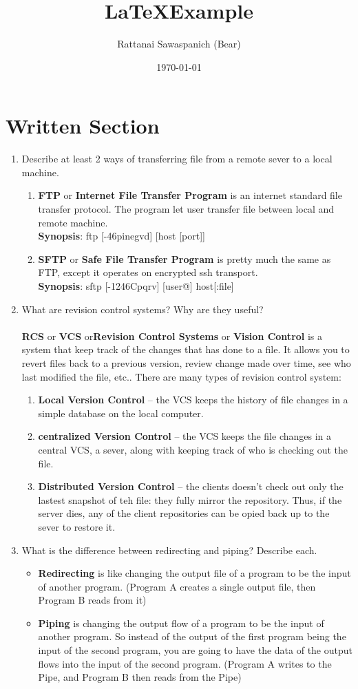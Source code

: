 \documentclass[a4paper,12pt]{article}
\title{\LaTeX Example}
\author{Rattanai Sawaspanich (Bear)}
\date{\today}
\begin{document}
\section{Written Section}
\begin{enumerate}
	\item Describe at least 2 ways of transferring file from a remote sever to a local machine.
		\begin{enumerate}
			\item \textbf{FTP} or \textbf{Internet File Transfer Program} is an internet standard file transfer protocol. The program let user transfer file between local and remote machine.
				\\ 
				\textbf{Synopsis}: ftp [-46pinegvd] [host [port]]
			\item \textbf{SFTP} or \textbf{Safe File Transfer Program} is pretty much the same as FTP, except it operates on encrypted ssh transport. 
				\\			
				\textbf{Synopsis}: sftp [-1246Cpqrv] [user@] host[:file]
		\end{enumerate}
	\item What are revision control systems? Why are they useful?\\ 
		\\
		 \textbf{RCS} or \textbf{VCS} or\textbf{Revision Control Systems} or \textbf{Vision Control} is a system that keep track of the changes that has done to a file. 
		It allows you to revert files back to a previous version, review change made over time, see who last modified the file, etc..
		There are many types of revision control system:
		\begin{enumerate}
			\item \textbf{Local Version Control} -- the VCS keeps the history of file changes in a simple database on the local computer.
			\item \textbf{centralized Version Control} -- the VCS keeps the file changes in a central VCS, a sever, along with keeping track of who is checking out the file.
			\item \textbf{Distributed Version Control} -- the clients doesn't check out only the lastest snapshot of teh file: they fully mirror the repository. Thus, if the server dies, any of the client repositories can be opied back up to the sever to restore it. 
		\end{enumerate}

	\item What is the difference between redirecting and piping? Describe each.
		\begin{itemize}
			\item \textbf{Redirecting} is like changing the output file of a program to be the input of another program. (Program A creates a single output file, then Program B reads from it)
			\item \textbf{Piping} is changing the output flow of a program to be the input of another program. So instead of the output of the first program being the input of the second program, you are going to have the data of the output flows into the input of the second program. (Program A writes to the Pipe, and Program B then reads from the Pipe)


\end{itemize}
\end{enumerate}
\end{document}

